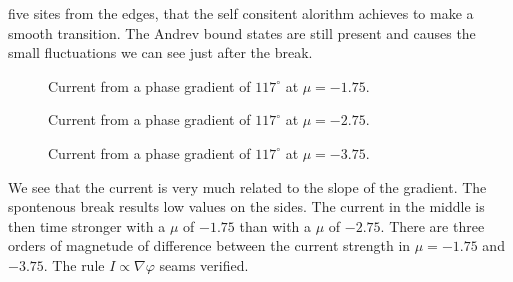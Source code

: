\documentclass[..\main.tex]{subfile}
\begin{document}
 five sites from the edges, that the self consitent
alorithm achieves to make a smooth transition. The Andrev bound states are still present and causes the small fluctuations we can see just after the
break.\\
\begin{figure}[H]
    
    \caption{Current from a phase gradient of $117^{\circ}$ at $\mu = -1.75$.}
\end{figure}
\begin{figure}[H]
    
    \caption{Current from a phase gradient of $117^{\circ}$ at $\mu = -2.75$.}
\end{figure}
\begin{figure}[H]
    
    \caption{Current from a phase gradient of $117^{\circ}$ at $\mu = -3.75$.}
\end{figure}

We see that the current is very much related to the slope of the gradient. 
The spontenous break results low values on the sides. 
The current in the middle is then time stronger with a $\mu$ of $-1.75$ than with a $\mu$ of $-2.75$. There are three orders of magnetude
of difference between the current strength in $\mu = -1.75$ and $-3.75$. The rule $I\propto\nabla\varphi$ seams verified.\\
\end{document}
